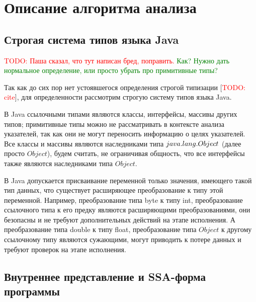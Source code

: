 \documentclass[14pt,titlepage]{extarticle}
\newcommand{\remark}[1]{\textcolor{Green}{#1}}
\newcommand{\todo}[1]{\textcolor{red}{TODO: #1}}
\newcommand{\todocite}{[\todo{cite}]}
\let\oldsection\section
\renewcommand{\section}{\newpage\oldsection}
\begin{document}
  \section{Описание алгоритма анализа}
    \label{section:algorithm}

    \subsection{Строгая система типов языка Java}
    \label{section:type_system}

      \todo{Паша сказал, что тут написан бред, поправить.}
      \remark{Как? Нужно дать нормальное определение, или просто убрать
      про примитивные типы?}

      Так как до сих пор нет устоявшегося определения строгой типизации
      \todocite, для определенности рассмотрим строгую систему типов языка
      Java.

      В Java ссылочными типами являются классы, интерфейсы, массивы других
      типов; примитивные типы можно не рассматривать в контексте анализа
      указателей, так как они не могут переносить информацию о целях
      указателей. Все классы и массивы являются наследниками типа
      $java\-.lang\-.Object$ (далее просто $Object$), будем считать,
      не ограничивая общность, что все интерфейсы также являются
      наследниками типа $Object$.

      В Java допускается присваивание переменной только значения, имеющего
      такой тип данных, что существует расширяющее преобразование к типу этой
      переменной.
      Например, преобразование типа byte к типу int, преобразование ссылочного
      типа к его предку являются расширяющими преобразованиями, они безопасны и
      не требуют дополнительных действий на этапе исполнения.
      А преобразование типа double к типу float, преобразование типа $Object$ к
      другому ссылочному типу являются сужающими, могут приводить к потере
      данных и требуют проверок на этапе исполнения.

    \subsection{Внутреннее представление и SSA-форма программы}
      \label{section:ir_and_ssa}
\end{document}

